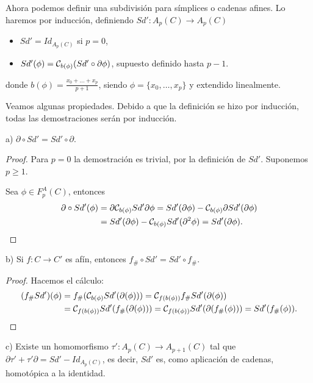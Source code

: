 Ahora podemos definir una subdivisión para símplices o cadenas afines. Lo haremos por inducción, definiendo ${Sd' \colon A_p(C) \to A_p(C)}$
\begin{itemize}
  \item $Sd' = Id_{A_p(C)}$ si $p = 0$,
  \item $Sd'(\phi) = {\mathcal C}_{b(\phi)}(Sd' \circ \partial \phi)$, supuesto definido hasta $p-1$.
\end{itemize}
donde $b(\phi) = \frac{x_0 + \dots + x_p}{p+1}$, siendo $\phi = \{x_0, \dots, x_p\}$ y extendido linealmente.

Veamos algunas propiedades. Debido a que la definición se hizo por inducción, todas las demostraciones serán por inducción.

a) $\partial \circ Sd' = Sd' \circ \partial$.

\begin{proof}
  Para $p = 0$ la demostración es trivial, por la definición de $Sd'$. Suponemos $p \geq 1$.

  Sea $\phi \in F_p^A(C)$, entonces
  \begin{align*}
    \partial \circ Sd'(\phi) &= \partial {\mathcal C}_{b(\phi)} Sd' \partial \phi = Sd'(\partial \phi) - {\mathcal C}_{b(\phi)} \partial Sd'(\partial \phi) \\
    &= Sd'(\partial \phi) - {\mathcal C}_{b(\phi)} Sd'(\partial^2 \phi) = Sd'(\partial \phi).
  \end{align*}
\end{proof}

b) Si $f \colon C \to C'$ es afín, entonces $f_\# \circ Sd' = Sd' \circ f_\#$.

\begin{proof}
  Hacemos el cálculo:
  \begin{align*}
    (f_\# Sd')(\phi) &= f_\#({\mathcal C}_{b(\phi)} Sd'(\partial(\phi))) = {\mathcal C}_{f(b(\phi))} f_\# Sd'(\partial(\phi))  \\
    &= {\mathcal C}_{f(b(\phi))} Sd'(f_\#(\partial(\phi))) = {\mathcal C}_{f(b(\phi))} Sd'(\partial(f_\#(\phi))) = Sd'(f_\#(\phi)).
  \end{align*}
\end{proof}

c) Existe un homomorfismo $\tau' \colon A_p(C) \to A_{p+1}(C)$ tal que ${\partial \tau' + \tau' \partial = Sd' - Id_{A_p(C)}}$,
es decir, $Sd'$ es, como aplicación de cadenas, homotópica a la identidad.

